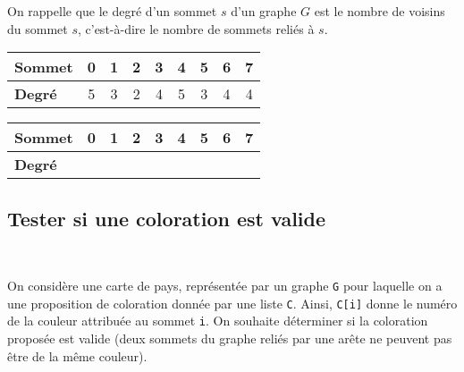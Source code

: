 On rappelle que le degré d'un sommet $s$ d'un graphe $G$ est le nombre de voisins du sommet $s$, c'est-à-dire le nombre de sommets reliés à $s$.

\ifprof
\begin{corrige}
\begin{center}
\begin{tabular}{lcccccccc}
\hline
\textbf{Sommet} 	& 0 & 1 & 2 & 3 & 4 & 5 & 6 & 7 \\
\hline
\textbf{Degré} 		& 5 & 3 & 2 & 4 & 5 & 3 & 4 & 4\\
\hline
\end{tabular}
\end{center}

\end{corrige}
\else

\fi
\begin{center}
\begin{tabular}{lcccccccc}
\hline
\textbf{Sommet} 	& 0 & 1 & 2 & 3 & 4 & 5 & 6 & 7 \\
\hline
\textbf{Degré} 		& & & & & & & & \\
\hline
\end{tabular}
\end{center}


\subsection{Tester si une coloration est valide}

\ifprof
\begin{corrige}~\\ \vspace{-.5cm}

\end{corrige}
\else
\fi

On considère une carte de pays, représentée par un graphe \lstinline{G} pour laquelle on a une proposition de coloration donnée par une liste \lstinline{C}. Ainsi, \lstinline{C[i]} donne le numéro de la couleur attribuée au sommet \lstinline{i}. On souhaite déterminer si la coloration proposée est valide (deux sommets du graphe reliés par une arête ne peuvent pas être de la même couleur).

